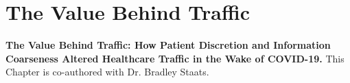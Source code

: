 \chapter{The Value Behind Traffic}

    \textbf{The Value Behind Traffic: How Patient Discretion and Information Coarseness Altered Healthcare Traffic in the Wake of COVID-19.}
    This Chapter is co-authored with Dr. Bradley Staats.


